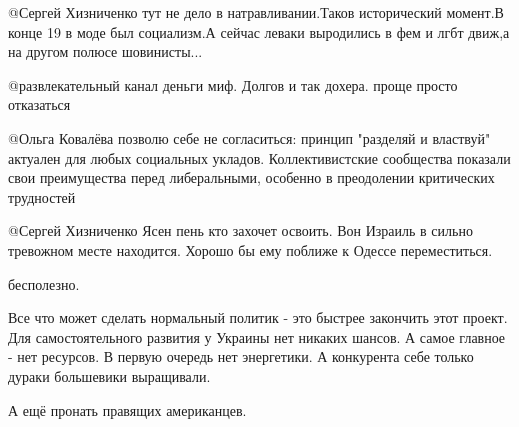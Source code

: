 \begin{itemize}
\begin{itemize}

@Сергей Хизниченко  тут не дело в натравливании.Таков исторический момент.В
конце 19 в моде был социализм.А сейчас леваки выродились в фем и лгбт движ,а
на другом полюсе шовинисты...



 @развлекательный канал  деньги миф. Долгов и так дохера. проще просто отказаться



@Ольга Ковалёва  позволю себе не согласиться: принцип "разделяй и властвуй"
актуален для любых социальных укладов. Коллективистские сообщества показали
свои преимущества перед либеральными, особенно в преодолении критических
трудностей


@Сергей Хизниченко  Ясен пень кто захочет освоить. Вон Израиль в сильно
тревожном месте находится. Хорошо бы ему поближе к Одессе переместиться.

бесполезно.

Все что может сделать нормальный политик - это быстрее закончить этот проект.
Для самостоятельного развития у Украины нет никаких шансов. А самое главное -
нет ресурсов. В первую очередь нет энергетики. А конкурента себе только дураки
большевики выращивали.

А ещё пронать правящих американцев.
\end{itemize} %

\end{itemize} %
